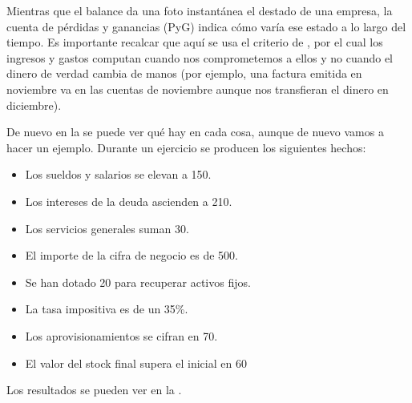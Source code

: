 \documentclass[nochap,palatino,notitlepage]{apuntes}
\begin{document}
Mientras que el balance da una foto instantánea el destado de una empresa, la cuenta de pérdidas y ganancias (PyG) indica cómo varía ese estado a lo largo del tiempo. Es importante recalcar que aquí se usa el criterio de , por el cual los ingresos y gastos computan cuando nos comprometemos a ellos y no cuando el dinero de verdad cambia de manos (por ejemplo, una factura emitida en noviembre va en las cuentas de noviembre aunque nos transfieran el dinero en diciembre).

De nuevo en la  se puede ver qué hay en cada cosa, aunque de nuevo vamos a hacer un ejemplo. Durante un ejercicio se producen los siguientes hechos:

\begin{itemize}
\item Los sueldos y salarios se elevan a 150.
\item Los intereses de la deuda ascienden a 210.
\item Los servicios generales suman 30.
\item El importe de la cifra de negocio es de 500.
\item Se han dotado 20 para recuperar activos fijos.
\item La tasa impositiva es de un 35\%.
\item Los aprovisionamientos se cifran en 70.
\item El valor del stock final supera el inicial en 60
\end{itemize}

Los resultados se pueden ver en la .
\end{document}
